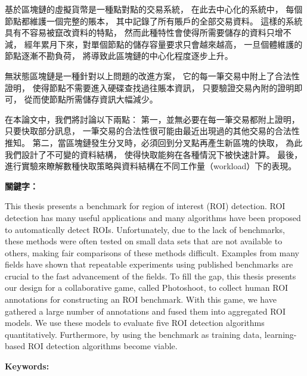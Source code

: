 \begin{abstractzh}
基於區塊鏈的虛擬貨幣是一種點對點的交易系統，
在此去中心化的系統中，
每個節點都維護一個完整的賬本，
其中記錄了所有賬戶的全部交易資料。
這樣的系統具有不容易被竄改資料的特點，
然而此種特性會使得所需要儲存的資料只增不減，
經年累月下來，對單個節點的儲存容量要求只會越來越高，
一旦個體維護的節點逐漸不勘負荷，
將導致此區塊鏈的中心化程度逐步上升。

無狀態區塊鏈是一種針對以上問題的改進方案，
它的每一筆交易中附上了合法性證明，
使得節點不需要進入硬碟查找過往賬本資訊，
只要驗證交易內附的證明即可，
從而使節點所需儲存資訊大幅減少。

在本論文中，我們將討論以下兩點：
第一，並無必要在每一筆交易都附上證明，
只要快取部分訊息，
一筆交易的合法性很可能由最近出現過的其他交易的合法性推知。
第二，當區塊鏈發生分叉時，必須回到分叉點再產生新區塊的快取，
為此我們設計了不可變的資料結構，
使得快取能夠在各種情況下被快速計算。
最後，進行實驗來瞭解數種快取策略與資料結構在不同工作量（workload）下的表現。


\bigbreak
\noindent \textbf{關鍵字：}{\, \makeatletter \@keywordszh \makeatother}
\end{abstractzh}

\begin{abstracten}
This thesis presents a benchmark for region of interest (ROI)
detection. ROI detection has many useful applications and many
algorithms have been proposed to automatically detect ROIs.
Unfortunately, due to the lack of benchmarks, these methods were
often tested on small data sets that are not available to others,
making fair comparisons of these methods difficult. Examples from
many fields have shown that repeatable experiments using published
benchmarks are crucial to the fast advancement of the fields. To
fill the gap, this thesis presents our design for a collaborative
game, called Photoshoot, to collect human ROI annotations for
constructing an ROI benchmark. With this game, we have gathered a
large number of annotations and fused them into aggregated ROI
models. We use these models to evaluate five ROI detection
algorithms quantitatively. Furthermore, by using the benchmark as
training data, learning-based ROI detection algorithms become
viable.

\bigbreak
\noindent \textbf{Keywords:}{\, \makeatletter \@keywordsen \makeatother}
\end{abstracten}

\begin{comment}
\category{I2.10}{Computing Methodologies}{Artificial Intelligence --
Vision and Scene Understanding} \category{H5.3}{Information
Systems}{Information Interfaces and Presentation (HCI) -- Web-based
Interaction.}

\terms{Design, Human factors, Performance.}

\keywords{Region of interest, Visual attention model, Web-based
games, Benchmarks.}
\end{comment}
